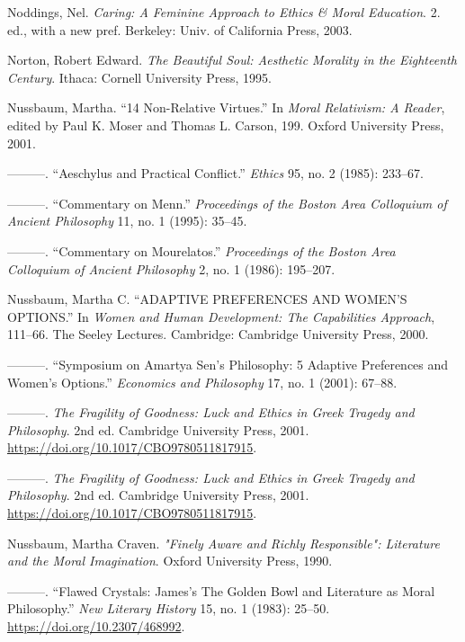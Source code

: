 \documentclass[phdthesis,12pt,final]{wuthesis}
\newlength{\cslhangindent}
\newenvironment{CSLReferences}[2] %
{\begin{list}{}{%
	\setlength{\itemindent}{0pt}
	\setlength{\leftmargin}{0pt}
	\setlength{\parsep}{0pt}
	\ifodd #1
	\setlength{\leftmargin}{\cslhangindent}
	\setlength{\itemindent}{-1\cslhangindent}
	\fi
	\setlength{\itemsep}{#2\baselineskip}}}
{\end{list}}
\theoremstyle{definition}
\theoremstyle{definition}
\theoremstyle{definition}
\theoremstyle{definition}
\theoremstyle{remark}
\begin{document}
\begin{CSLReferences}{1}{0}
Noddings, Nel. \emph{Caring: A Feminine Approach to Ethics \& Moral Education}. 2. ed., with a new pref. Berkeley: Univ. of California Press, 2003.

Norton, Robert Edward. \emph{The Beautiful Soul: Aesthetic Morality in the Eighteenth Century}. Ithaca: Cornell University Press, 1995.

Nussbaum, Martha. {``14 {Non-Relative Virtues}.''} In \emph{Moral {Relativism}: {A Reader}}, edited by Paul K. Moser and Thomas L. Carson, 199. Oxford University Press, 2001.

---------. {``Aeschylus and Practical Conflict.''} \emph{Ethics} 95, no. 2 (1985): 233--67.

---------. {``Commentary on {Menn}.''} \emph{Proceedings of the Boston Area Colloquium of Ancient Philosophy} 11, no. 1 (1995): 35--45.

---------. {``Commentary on {Mourelatos}.''} \emph{Proceedings of the Boston Area Colloquium of Ancient Philosophy} 2, no. 1 (1986): 195--207.

Nussbaum, Martha C. {``{ADAPTIVE PREFERENCES AND WOMEN}'{S OPTIONS}.''} In \emph{Women and Human Development: {The} Capabilities Approach}, 111--66. The Seeley Lectures. Cambridge: Cambridge University Press, 2000.

---------. {``Symposium on {Amartya Sen}'s Philosophy: 5 Adaptive Preferences and Women's Options.''} \emph{Economics and Philosophy} 17, no. 1 (2001): 67--88.

---------. \emph{The {Fragility} of {Goodness}: {Luck} and {Ethics} in {Greek Tragedy} and {Philosophy}}. 2nd ed. Cambridge University Press, 2001. \url{https://doi.org/10.1017/CBO9780511817915}.

---------. \emph{The {Fragility} of {Goodness}: {Luck} and {Ethics} in {Greek Tragedy} and {Philosophy}}. 2nd ed. Cambridge University Press, 2001. \url{https://doi.org/10.1017/CBO9780511817915}.

Nussbaum, Martha Craven. \emph{"{Finely Aware} and {Richly Responsible}": {Literature} and the {Moral Imagination}}. Oxford University Press, 1990.

---------. {``Flawed {Crystals}: {James}'s {The Golden Bowl} and {Literature} as {Moral Philosophy}.''} \emph{New Literary History} 15, no. 1 (1983): 25--50. \url{https://doi.org/10.2307/468992}.


\end{CSLReferences}
\end{document}
